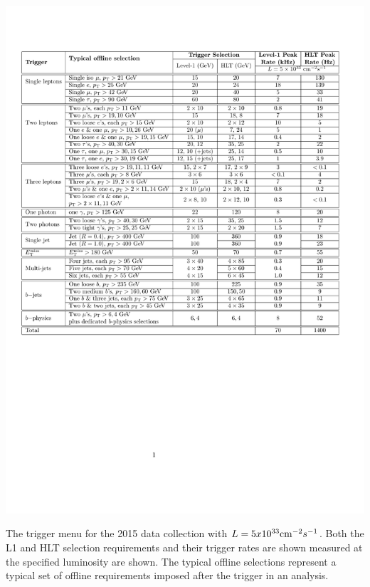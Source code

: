 \begin{table}[hbtp]
\includegraphics[width=\fullfig]{figures/trigger_menu.pdf}
\caption{The trigger menu for the 2015 data collection with $L = 5 x 10^{33}\mathrm{cm}^{-2}s^{-1}$. Both the L1 and \ac{HLT} selection requirements and their trigger rates are shown measured at the specified luminosity are shown. The typical offline selections represent a typical set of offline requirements imposed after the trigger in an analysis.}
\label{tab:trigger_menu}
\end{table}

